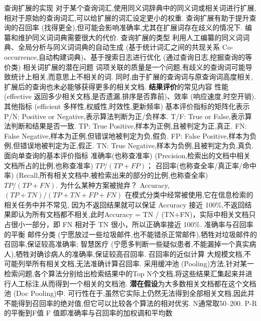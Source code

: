\documentclass[10pt, utf8]{ctexart}
\begin{document}
\begin{multicols}{4}
    {\color{blue}查询扩展的实现}
    对于某个查询词汇,使用同义词辞典中的同义词或相关词进行扩展,相对于原始的查询词汇,可以给扩展的词汇设定更小的权重.
    查询扩展有助于提升查询的召回率 (找得更全),但可能会影响准确率,尤其在扩展词存在歧义的情况下.
    编纂和维护同义词词典需要很大的代价.
    {\color{blue}查询扩展的类型}
    利用人工编纂的同义词词典、全局分析与同义词词典的自动生成 (基于统计词汇之间的共现关系 Co-occurrence,自动构建词典)、基于搜索日志进行优化 (通过查询日志,挖掘查询的等价类)
    {\color{blue}相关词扩展的潜在问题}
    词项关联的质量是一个问题,有歧义的查询词可能导致统计上相关,而意思上不相关的词.
    同时,由于扩展的查询词与原查询词高度相关,扩展后的查询也未必能够获得更多的相关文档.
    {\color{purple_}\textbf{结果评价}\color{blue}的常见内容}
    性能 (effective 返回多少相关文档,是否遗漏,排序是否靠前)、效率 (响应速度,时空开销).
    其他指标 (efficient 多样性,权威性,时效性,更新频率)
    {\color{blue}基本评价指标的矩阵化表示}
    P/N\@: Positive or Negative,表示算法判断为正/负样本.
    T/F\@: True or False,表示算法判断和结果是否一致.
    TP\@: True Positive,样本为正例,且被判定为正,真正.
    FN\@: False Negative,样本为正例,但错误地被判定为负,假负.
    FP\@: False Positive,样本为负例,但错误地被判定为正,假正.
    TN\@: True Negative,样本为负例,且被判定为负,真负.
    {\color{red}面向单查询的基本评价指标}
    {\color{blue}准确率(也称查准率)} (Precision,检索出的文档中相关文档所占的比例,也称查准率) $TP/(TP+FP)$；
    {\color{blue}召回率(也称查全率/真正率/命中率)} (Recall,所有相关文档中,被检索出来的部分的比例,也称查全率) $TP/(TP+FN)$.
        {\color{blue}为什么某种方案被抛弃？}
    Accuracy, $(TP+TN)/(TP+TN+FP+FN)$ 在模式分类中经常被使用,它在信息检索的相关任务中并不常见,
    因为不返回结果就可以保证 Accuracy 接近 100\%,不返回结果即认为所有文档都不相关,此时Accuracy = TN / (TN+FN)，实际中相关文档只占很小一部分，即 FN 相对于 TN 很小，所以正确率接近 100\%.
    {\color{blue}准确率与召回率的平衡}
    邮件分类 (宁愿放过一些垃圾邮件,也不能错杀正常邮件),牺牲对垃圾邮件的召回率,保证较高准确率;
    智慧医疗 (宁愿多判断一些疑似患者,不能漏掉一个真实病人),牺牲对确诊病人的准确率,保证较高召回率.
    {\color{blue}召回率的近似计算}
    大规模文档,不可能列举所有相关文档,无法准确计算召回率.
    采用缓冲池 (Pooling)方法,针对某一检索问题,各个算法分别给出检索结果中的Top N个文档,将这些结果汇集起来并进行人工标注,从而得到一个相关的文档池.
    \textbf{潜在假设}为大多数相关文档都在这个文档池 (Doc Pooling)中.
    可行性在于,虽然它实际上仍然无法得到全部相关文档,因此并不能得到召回率的绝对值,但它可以比较各个算法的相对优劣.
    N通常取50--200.
    {\color{red}P-R的平衡到F值}
    F 值即准确率与召回率的加权调和平均数

\end{multicols}
\end{document}
